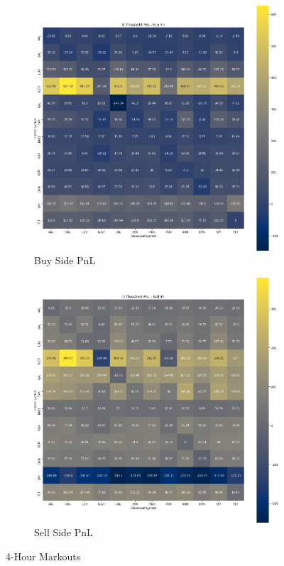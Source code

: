 \documentclass{article}
\begin{document}
\begin{figure}[h!]
  \centering
  \begin{subfigure}{.5\textwidth}
    \centering
    \includegraphics[width=.95\linewidth]{../Figures/pair_buy_pnl_4h.png}
    \caption{Buy Side PnL}
  \end{subfigure}%
  \begin{subfigure}{.5\textwidth}
    \centering
    \includegraphics[width=.95\linewidth]{../Figures/pair_sell_pnl_4h.png}
    \caption{Sell Side PnL}
  \end{subfigure}
  \caption{4-Hour Markouts}
\end{figure}
\end{document}

